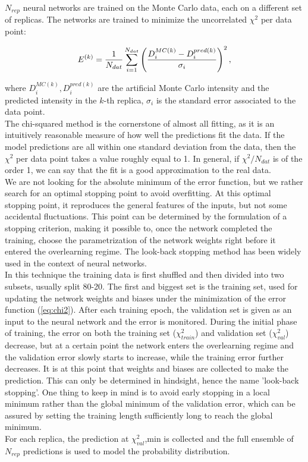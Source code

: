 \documentclass[11pt,a4paper]{article}
\def\frac#1#2{{{#1}\over {#2}}}
\numberwithin{equation}{section}
\numberwithin{figure}{section}
\numberwithin{table}{section}
\begin{document}
$N_{rep}$ neural networks are trained on the Monte Carlo data, each on a different set of replicas. The networks are trained to minimize the uncorrelated $\chi^2$ per data point:

\begin{equation}
    E^{(k)} = \frac{1}{N_{dat}}\sum_{i=1}^{N_{dat}}\left(\frac{D_i^{MC(k)} - D_i^{pred(k)}}{\sigma_i}\right)^2, 
\end{equation}

where $D_i^{MC(k)}, D_i^{pred(k)}$ are the artificial Monte Carlo intensity and the predicted intensity in the $k$-th replica, $\sigma_i$ is the standard error associated to the data point. \\
The chi-squared method is the cornerstone of almost all fitting, as it is an intuitively reasonable measure of how well the predictions fit the data. If the model predictions are all within one standard deviation from the data, then the $\chi^2$ per data point takes a value roughly equal to 1. In general, if $\chi^2/N_{dat}$ is of the order 1, we can say that the fit is a good approximation to the real data. \\

We are not looking for the absolute minimum of the error function, but we rather search for an optimal stopping point to avoid overfitting. At this optimal stopping point, it reproduces the general features of the inputs, but not some accidental fluctuations. This point can be determined by the formulation of a stopping criterion, making it possible to, once the network completed the training, choose the parametrization of the network weights right before it entered the overlearning regime. The look-back stopping method has been widely used in the context of neural networks. \\
In this technique the training data is first shuffled and then divided into two subsets, usually split 80-20. The first and biggest set is the training set, used for updating the network weights and biases under the minimization of the error function (\ref{eq:chi2}). After each training epoch, the validation set is given as an input to the neural network and the error  is monitored. During the initial phase of training, the error on both the training set ($\chi^2_{train}$) and validation set ($\chi^2_{val}$) decrease, but at a certain point the network enters the overlearning regime and the validation error slowly starts to increase, while the training error further decreases. It is at this point that weights and biases are collected to make the prediction. This can only be determined in hindsight, hence the name 'look-back stopping'. One thing to keep in mind is to avoid early stopping in a local minimum rather than the global minimum of the validation error, which can be assured by setting the training length sufficiently long to reach the global minimum.\\
For each replica, the prediction at $\chi^2_{val}$,min is collected and the full ensemble of $N_{rep}$ predictions is used to model the probability distribution. 
\end{document}
